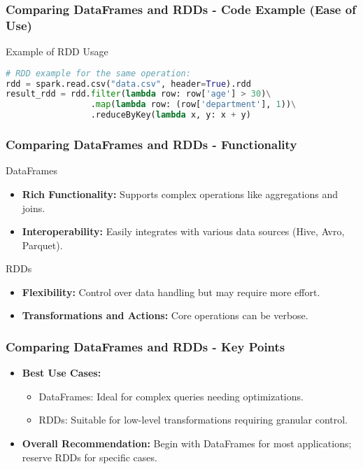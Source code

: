 \documentclass[aspectratio=169]{beamer}
\begin{document}
\begin{frame}[fragile]
    \frametitle{Comparing DataFrames and RDDs - Code Example (Ease of Use)}
    \begin{block}{Example of RDD Usage}
        \begin{lstlisting}[language=Python]
# RDD example for the same operation:
rdd = spark.read.csv("data.csv", header=True).rdd
result_rdd = rdd.filter(lambda row: row['age'] > 30)\
                 .map(lambda row: (row['department'], 1))\
                 .reduceByKey(lambda x, y: x + y)
        \end{lstlisting}
    \end{block}
\end{frame}

\begin{frame}[fragile]
    \frametitle{Comparing DataFrames and RDDs - Functionality}
    \begin{block}{DataFrames}
        \begin{itemize}
            \item \textbf{Rich Functionality:} Supports complex operations like aggregations and joins.
            \item \textbf{Interoperability:} Easily integrates with various data sources (Hive, Avro, Parquet).
        \end{itemize}
    \end{block}
    
    \begin{block}{RDDs}
        \begin{itemize}
            \item \textbf{Flexibility:} Control over data handling but may require more effort.
            \item \textbf{Transformations and Actions:} Core operations can be verbose.
        \end{itemize}
    \end{block}
\end{frame}

\begin{frame}[fragile]
    \frametitle{Comparing DataFrames and RDDs - Key Points}
    \begin{itemize}
        \item \textbf{Best Use Cases:}
        \begin{itemize}
            \item DataFrames: Ideal for complex queries needing optimizations.
            \item RDDs: Suitable for low-level transformations requiring granular control.
        \end{itemize}
        \item \textbf{Overall Recommendation:} Begin with DataFrames for most applications; reserve RDDs for specific cases.
    \end{itemize}
\end{frame}
\end{document}
